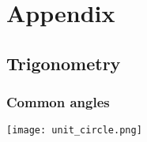 \section{Appendix}

\createsectiontoc{}

\subsection{Trigonometry}
\subsubsection{Common angles}
\begin{center}
    \texttt{[image: unit\_circle.png]}
\end{center}


